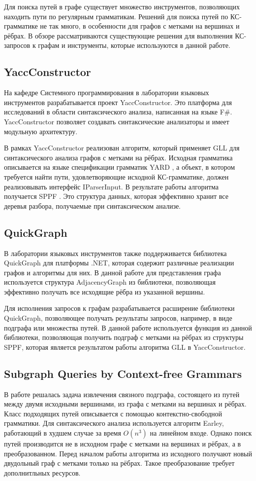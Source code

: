 \documentclass[14pt]{matmex-diploma}
\begin{document}
Для поиска путей в графе существует множество инструментов, позволяющих находить пути по регулярным грамматикам. Решений для поиска путей по КС-грамматике не так много, в особенности для графов с метками на вершинах и рёбрах. В обзоре рассматриваются существующие решения для выполнения КС-запросов к графам и инструменты, которые используются в данной работе.

\subsection{YaccConstructor}

На кафедре Системного программирования в лаборатории языковых инструментов разрабатывается проект YaccConstructor. Это платформа для исследований в области синтаксического анализа, написанная на языке F\#. YaccConstructor позволяет создавать синтаксические анализаторы и имеет модульную архитектуру.

В рамках YaccConstructor реализован алгоритм, который применяет GLL для синтаксического анализа графов с метками на рёбрах. Исходная грамматика описывается на языке спецификации грамматик YARD \cite{YARD}, а  объект, в котором требуется найти пути, удовлетворяющие исходной КС-грамматике, должен реализовывать интерфейс IParserInput. В результате работы алгоритма получается SPPF \cite{rekers1992parser}. Это структура данных, которая эффективно хранит все деревья разбора, получаемые при синтаксическом анализе.

\subsection{QuickGraph}

В лаборатории языковых инструментов также поддерживается библиотека QuickGraph для платформы .NET, которая содержит различные реализации графов и алгоритмы для них. В данной работе для представления графа используется структура AdjacencyGraph из библиотеки, позволяющая эффективно получать все исходящие рёбра из указанной вершины.

Для исполнения запросов к графам разрабатывается расширение библиотеки QuickGraph, позволяющее получать результаты запросов, например, в виде подграфа или множества путей. В данной работе используется функция из данной библиотеки, позволяющая получить подграф с метками на рёбрах из структуры SPPF, которая является результатом работы алгоритма GLL в YaccConstructor.


\subsection{Subgraph Queries by Context-free Grammars}
В работе \cite{subgraph} решалась задача извлечения связного подграфа, состоящего из путей между двумя исходными вершинами, из графа с метками на вершинах и рёбрах. Класс подходящих путей описывается с помощью контекстно-свободной грамматики. Для синтаксического анализа используется алгоритм Earley, работающий в худшем случае за время $O(n^3)$ на линейном входе. Однако поиск путей производится не в исходном графе с метками на вершинах и рёбрах, а в преобразованном. Перед началом работы алгоритма из исходного получают новый двудольный граф с метками только на рёбрах. Такое преобразование требует дополнитльных ресурсов.
\end{document}
